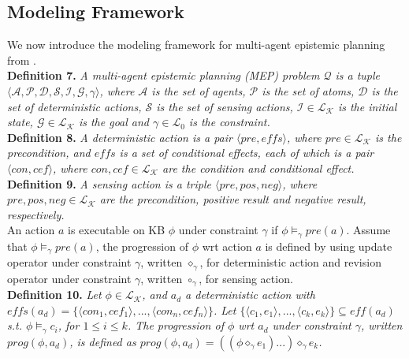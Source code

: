 \documentclass{llncs}
\begin{document}
\subsection{Modeling Framework}
 We now introduce the modeling framework for multi-agent epistemic planning from \cite{Liu2017A}.
 \vspace{0.05in}\\
\textbf{Definition 7.} \textit{A multi-agent epistemic planning (MEP) problem $\mathcal{Q}$ is a tuple $\langle\mathcal{A}, \mathcal{P}, \mathcal{D}, \mathcal{S}, \mathcal{I}, \mathcal{G}, \gamma\rangle$, where $\mathcal{A}$ is the set of agents, $\mathcal{P}$ is the set of atoms, $\mathcal{D}$ is the set of deterministic actions, $\mathcal{S}$ is the set of sensing actions, $\mathcal{I}\in\mathcal{L}_\mathcal{K}$ is the initial state, $\mathcal{G}\in\mathcal{L}_\mathcal{K}$ is the goal and $\gamma\in\mathcal{L}_0$ is the constraint.}\vspace{0.05in}\\
\textbf{Definition 8.} \textit{A deterministic action is a pair $\langle pre, effs\rangle$, where $pre\in\mathcal{L}_\mathcal{K}$ is the precondition, and $effs$ is a set of conditional effects, each of which is a pair $\langle con, cef\rangle$, where $con, cef\in\mathcal{L}_\mathcal{K}$ are the condition and conditional effect.}\vspace{0.05in}\\
\textbf{Definition 9.} \textit{A sensing action is a triple $\langle pre, pos, neg \rangle$, where $pre, pos, neg\in\mathcal{L}_\mathcal{K}$ are the precondition, positive result and negative result, respectively.}\vspace{0.05in}\\
An action $a$ is executable on KB $\phi$ under constraint $\gamma$ if $\phi\models_\gamma pre(a)$. Assume that $\phi\models_\gamma pre(a)$, the progression of $\phi$ wrt action $a$ is defined by using update operator under constraint $\gamma$, written $\diamond_\gamma$,  for deterministic action and revision operator under constraint $\gamma$, written $\circ_\gamma$, for sensing action.\vspace{0.05in}\\
\textbf{Definition 10.} \textit{Let $\phi\in\mathcal{L}_\mathcal{K}$, and $a_d$ a deterministic action with $effs(a_d)=\{\langle con_1, cef_1\rangle,...,\langle con_n, cef_n\rangle\}$. Let $\{\langle c_1, e_1 \rangle,...,\langle c_k, e_k\rangle\}\subseteq eff(a_d)$ s.t. $\phi\models_\gamma c_i$, for $1\leq i \leq k$. The progression of $\phi$ wrt $a_d$ under constraint $\gamma$, written $prog(\phi, a_d)$, is defined as $prog(\phi, a_d)=((\phi\diamond_\gamma e_1)...)\diamond_\gamma e_k$.}\vspace{0.05in}\\
\end{document}
